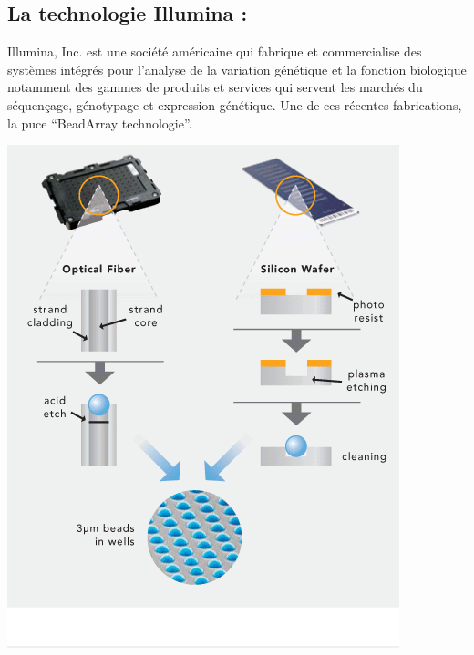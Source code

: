 \documentclass[a4paper,10pt]{article}
\begin{document}
\subsection{La technologie Illumina :}
Illumina, Inc. est une société américaine qui fabrique et commercialise des systèmes intégrés pour l'analyse de la variation génétique et la fonction biologique 
notamment des gammes de produits et services qui servent les marchés du séquençage, génotypage et expression génétique.
\newline
Une de ces récentes fabrications, la puce ``BeadArray technologie''.
\begin{center}
 \includegraphics[scale=0.5]{./image/beadarray.png}
\end{center}
\end{document}
